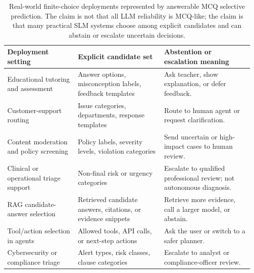 
\begin{table}[!htbp]
\centering
\small
\caption{Real-world finite-choice deployments represented by answerable MCQ selective prediction. The claim is not that all LLM reliability is MCQ-like; the claim is that many practical SLM systems choose among explicit candidates and can abstain or escalate uncertain decisions.}
\label{tab:finite-choice-use-cases}
\begin{tabularx}{\textwidth}{p{}X p{}}
\toprule
Deployment setting & Explicit candidate set & Abstention or escalation meaning \\
\midrule
Educational tutoring and assessment & Answer options, misconception labels, feedback templates & Ask teacher, show explanation, or defer feedback. \\
Customer-support routing & Issue categories, departments, response templates & Route to human agent or request clarification. \\
Content moderation and policy screening & Policy labels, severity levels, violation categories & Send uncertain or high-impact cases to human review. \\
Clinical or operational triage support & Non-final risk or urgency categories & Escalate to qualified professional review; not autonomous diagnosis. \\
RAG candidate-answer selection & Retrieved candidate answers, citations, or evidence snippets & Retrieve more evidence, call a larger model, or abstain. \\
Tool/action selection in agents & Allowed tools, API calls, or next-step actions & Ask the user or switch to a safer planner. \\
Cybersecurity or compliance triage & Alert types, risk classes, clause categories & Escalate to analyst or compliance-officer review. \\
\bottomrule
\end{tabularx}
\end{table}
